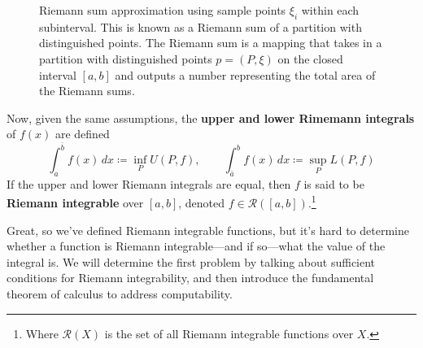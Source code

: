 \begin{definition}
\begin{figure}[H]
      \caption{Riemann sum approximation using sample points $\xi_i$ within each subinterval. This is known as a Riemann sum of a partition with distinguished points. The Riemann sum is a mapping that takes in a partition with distinguished points $p = (P, \xi)$ on the closed interval $[a, b]$ and outputs a number representing the total area of the Riemann sums. }
      \label{fig:riemann-sum-xi}
    \end{figure}
  \end{definition}

  \begin{definition}
    \label{def:riemann-integral}
    Now, given the same assumptions, the \textbf{upper and lower Rimemann integrals} of $f(x)$ are defined 
    \begin{equation}
      \int_a^{\bar{b}} f(x) \, dx \coloneqq \inf_P U(P, f), \qquad \int_{\bar{a}}^{b} f(x) \, dx \coloneqq \sup_P L(P, f)
    \end{equation}
    If the upper and lower Riemann integrals are equal, then $f$ is said to be \textbf{Riemann integrable} over $[a, b]$, denoted $f \in \mathcal{R}([a, b])$.\footnote{Where $\mathcal{R}(X)$ is the set of all Riemann integrable functions over $X$.}
  \end{definition} 

  Great, so we've defined Riemann integrable functions, but it's hard to determine whether a function is Riemann integrable---and if so---what the value of the integral is. We will determine the first problem by talking about sufficient conditions for Riemann integrability, and then introduce the fundamental theorem of calculus to address computability. 

